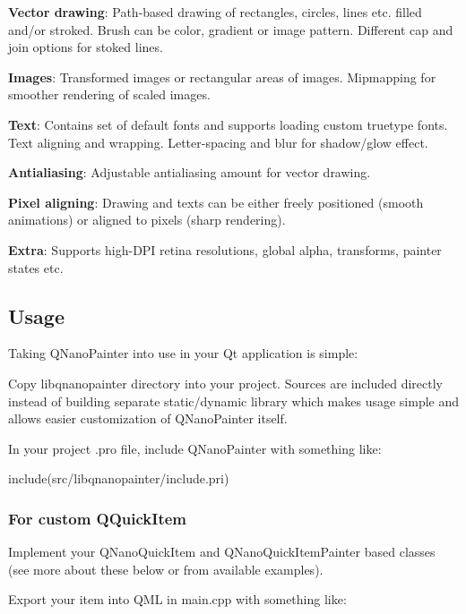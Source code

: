 \begin{DoxyItemize}
\item {\bfseries Vector drawing}\+: Path-\/based drawing of rectangles, circles, lines etc. filled and/or stroked. Brush can be color, gradient or image pattern. Different cap and join options for stoked lines.
\item {\bfseries Images}\+: Transformed images or rectangular areas of images. Mipmapping for smoother rendering of scaled images.
\item {\bfseries Text}\+: Contains set of default fonts and supports loading custom truetype fonts. Text aligning and wrapping. Letter-\/spacing and blur for shadow/glow effect.
\item {\bfseries Antialiasing}\+: Adjustable antialiasing amount for vector drawing.
\item {\bfseries Pixel aligning}\+: Drawing and texts can be either freely positioned (smooth animations) or aligned to pixels (sharp rendering).
\item {\bfseries Extra}\+: Supports high-\/\+D\+PI retina resolutions, global alpha, transforms, painter states etc.
\end{DoxyItemize}

\subsection*{Usage}

Taking Q\+Nano\+Painter into use in your Qt application is simple\+:


\begin{DoxyItemize}
\item Copy \textquotesingle{}libqnanopainter\textquotesingle{} directory into your project. Sources are included directly instead of building separate static/dynamic library which makes usage simple and allows easier customization of Q\+Nano\+Painter itself.
\item In your project .pro file, include Q\+Nano\+Painter with something like\+:
\end{DoxyItemize}


\begin{DoxyCode}
include(src/libqnanopainter/include.pri)
\end{DoxyCode}
 \subsubsection*{For custom Q\+Quick\+Item}


\begin{DoxyItemize}
\item Implement your Q\+Nano\+Quick\+Item and Q\+Nano\+Quick\+Item\+Painter based classes (see more about these below or from available examples).
\item Export your item into Q\+ML in main.\+cpp with something like\+:
\end{DoxyItemize}


